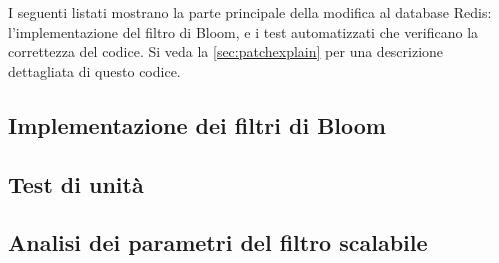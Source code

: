 I seguenti listati mostrano la parte principale della modifica al database Redis:
l'implementazione del filtro di Bloom, e i test automatizzati che verificano la correttezza
del codice. Si veda la \autoref{sec:patchexplain} per una descrizione dettagliata di questo codice.

\subsection{Implementazione dei filtri di Bloom}

\subsection{Test di unità}

\subsection{Analisi dei parametri del filtro scalabile}
